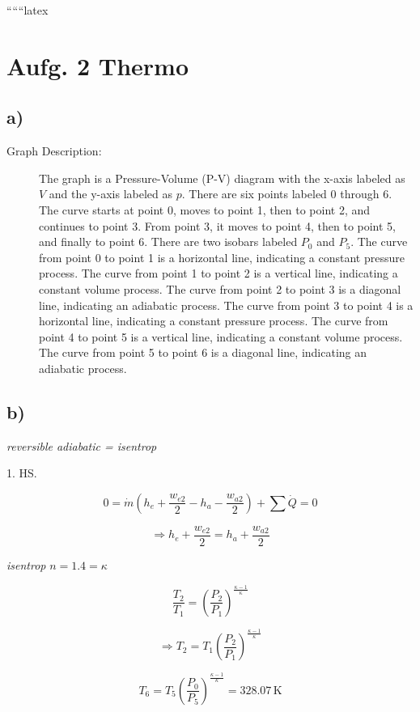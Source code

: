 
``````latex


\section*{Aufg. 2 Thermo}

\subsection*{a)}

\begin{description}
    \item[Graph Description:] The graph is a Pressure-Volume (P-V) diagram with the x-axis labeled as $V$ and the y-axis labeled as $p$. There are six points labeled 0 through 6. The curve starts at point 0, moves to point 1, then to point 2, and continues to point 3. From point 3, it moves to point 4, then to point 5, and finally to point 6. There are two isobars labeled $P_0$ and $P_5$. The curve from point 0 to point 1 is a horizontal line, indicating a constant pressure process. The curve from point 1 to point 2 is a vertical line, indicating a constant volume process. The curve from point 2 to point 3 is a diagonal line, indicating an adiabatic process. The curve from point 3 to point 4 is a horizontal line, indicating a constant pressure process. The curve from point 4 to point 5 is a vertical line, indicating a constant volume process. The curve from point 5 to point 6 is a diagonal line, indicating an adiabatic process.
\end{description}

\subsection*{b)}

\textit{reversible adiabatic = isentrop}

1. HS.

\[
0 = \dot{m} \left( h_e + \frac{w_{e2}}{2} - h_a - \frac{w_{a2}}{2} \right) + \sum \dot{Q} = 0
\]

\[
\Rightarrow h_e + \frac{w_{e2}}{2} = h_a + \frac{w_{a2}}{2}
\]

\textit{isentrop} \( n = 1.4 = \kappa \)

\[
\frac{T_2}{T_1} = \left( \frac{P_2}{P_1} \right)^{\frac{\kappa - 1}{\kappa}}
\]

\[
\Rightarrow T_2 = T_1 \left( \frac{P_2}{P_1} \right)^{\frac{\kappa - 1}{\kappa}}
\]

\[
T_6 = T_5 \left( \frac{P_0}{P_5} \right)^{\frac{\kappa - 1}{\kappa}} = 328.07 \, \text{K}
\]


